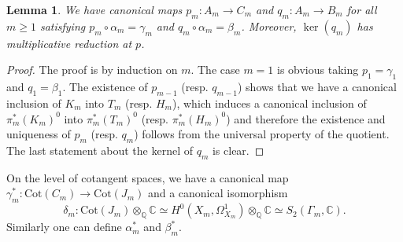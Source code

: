 \documentclass[a4paper,11pt]{amsart}
\numberwithin{equation}{section}
\theoremstyle{plain}
\newtheorem{lemma}[theorem]{Lemma}
\theoremstyle{definition}
\theoremstyle{remark}
\newcommand{\Q}{\mathbb{Q}}
\newcommand{\C}{\mathbb{C}}
\newcommand{\Cot}{\mathrm{Cot}}
\begin{document}
\begin{lemma}\label{lemma3.1} We have canonical maps $p_m\colon A_m\rightarrow C_m$ and $q_m\colon A_m\rightarrow B_m$ for all $m\geq 1$ satisfying
$p_m\circ\alpha_m=\gamma_m$ and $q_m\circ\alpha_m=\beta_m$. Moreover, $\ker(q_m)$ has multiplicative reduction at $p$. 
\end{lemma}
\begin{proof}
    The proof is by induction on $m$. The case $m=1$ is obvious taking $p_1=\gamma_1$ and $q_1=\beta_1$. 
The existence of $p_{m-1}$ (resp. $q_{m-1}$) shows that we have a canonical inclusion of $K_m$ into $T_m$ (resp. $H_m$), which induces a canonical inclusion of $\pi^*_m(K_m)^0$ into $\pi^*_m(T_m)^0$ (resp. $\pi^*_m(H_m)^0$) and therefore the existence and uniqueness of $p_m$ (resp. $q_m$) follows from the universal property of the quotient.
The last statement about the kernel of $q_m$ is clear. 
\end{proof}

On the level of cotangent spaces, we have a 
canonical map $\gamma_m^*\colon \Cot(C_m)\rightarrow \Cot(J_m)$ and a canonical isomorphism 
\[\delta_m\colon \Cot(J_m)\otimes_\Q\C\simeq H^0(X_m,\Omega_{X_m}^1)\otimes_\Q\C \simeq S_2(\Gamma_m,\C).\] 
Similarly one can define $\alpha_m^*$ and $\beta_m^*$. 
\end{document}
